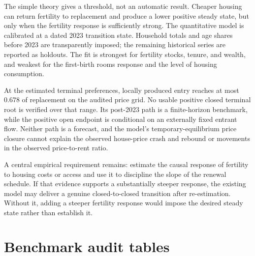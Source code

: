 \documentclass[11pt]{article}
\theoremstyle{definition}
\newcommand{\1}{\mathbf 1}
\newif\iftechnicalappendix
\begin{document}
The simple theory gives a threshold, not an automatic result. Cheaper housing
can return fertility to replacement and produce a lower positive steady state,
but only when the fertility response is sufficiently strong. The quantitative
model is calibrated at a dated 2023 transition state. Household totals and age
shares before 2023 are transparently imposed; the remaining historical series
are reported as holdouts. The fit is strongest for fertility stocks, tenure,
and wealth, and weakest for the first-birth rooms response and the level of
housing consumption.

At the estimated terminal preferences, locally produced entry reaches at most
\(0.678\) of replacement on the audited price grid. No usable positive closed
terminal root is verified over that range. Its post-2023 path is a
finite-horizon benchmark, while the positive open endpoint is conditional on
an externally fixed entrant flow. Neither path is a forecast, and the model's
temporary-equilibrium price closure cannot explain the observed house-price
crash and rebound or movements in the observed price-to-rent ratio.

A central empirical requirement remains: estimate the causal response of
fertility to housing costs or access and use it to discipline the slope of the
renewal schedule. If that evidence supports a substantially steeper response,
the existing model may deliver a genuine closed-to-closed transition after
re-estimation. Without it, adding a steeper fertility response would impose the
desired steady state rather than establish it.

\iftechnicalappendix
\appendix

\section{Benchmark audit tables}
\label{app:fit}
\end{document}
